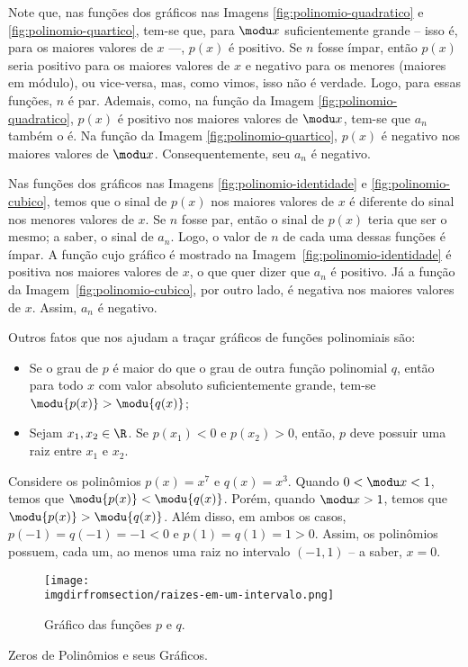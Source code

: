 \begin{solution}
  Note que, nas funções dos gráficos nas Imagens \ref{fig:polinomio-quadratico} e \ref{fig:polinomio-quartico},
  tem-se que, para $\modu x$ suficientemente grande -- isso é, para os maiores valores de $x$ ---, 
  $p(x)$ é positivo. 
  Se $n$ fosse ímpar, então $p(x)$ seria positivo para os maiores valores de $x$ e negativo para os menores (maiores
  em módulo), ou vice-versa, mas, como vimos, isso não é verdade. 
  Logo, para essas funções, $n$ é par. 
  Ademais, como, na função da Imagem \ref{fig:polinomio-quadratico}, $p(x)$ é positivo nos maiores valores de $\modu x$, 
  tem-se que $a_n$ também o é. Na função da Imagem \ref{fig:polinomio-quartico}, $p(x)$ é negativo nos maiores
  valores de $\modu x$. Consequentemente, seu $a_n$ é negativo.

  Nas funções dos gráficos nas Imagens \ref{fig:polinomio-identidade} e \ref{fig:polinomio-cubico}, temos que o 
  sinal de $p(x)$ nos maiores valores de $x$ é diferente do sinal nos menores valores de $x$.
  Se $n$ fosse par, então o sinal de $p(x)$ teria que ser o mesmo; a saber, o sinal de $a_n$.
  Logo, o valor de $n$ de cada uma dessas funções é ímpar.  
  A função cujo gráfico é mostrado na Imagem~\ref{fig:polinomio-identidade} é positiva nos maiores valores de $x$,
  o que quer dizer que $a_n$ é positivo. 
  Já a função da Imagem~\ref{fig:polinomio-cubico}, por outro lado, é negativa nos maiores valores de $x$.
  Assim, $a_n$ é negativo.
\end{solution}


Outros fatos que nos ajudam a traçar gráficos de funções polinomiais são:
%
\begin{itemize}
\item Se o grau de $p$ é maior do que o grau de outra função polinomial $q$, 
então para todo $x$ com valor absoluto suficientemente grande, 
tem-se $\modu {p(x)} > \modu{q(x)}$;
\item Sejam $x_1, x_2 \in \R$. Se $p(x_1) < 0$ e $p(x_2)>0$,
então, $p$ deve possuir uma raiz entre $x_1$ e $x_2$.
\end{itemize}

\begin{example}
Considere os polinômios $p(x) = x^7 $ e $q(x)=x^3$. 
Quando $0< \modu x < 1$, temos que $\modu {p(x)} < \modu{q(x)}$. 
Porém, quando $ \modu x > 1$, temos que $\modu {p(x)} > \modu{q(x)}$. 
Além disso, em ambos os casos, $p(-1) = q(-1) = -1 <0$ e $p(1) = q(1) = 1 >0$.
Assim, os polinômios possuem, cada um, ao menos uma raiz no
intervalo $(-1, 1)$ -- a saber, $x=0$.
\end{example}

\begin{figure}[H]
  \centering\texttt{[image: \\imgdirfromsection/raizes-em-um-intervalo.png]}
  \caption{Gráfico das funções $p$ e $q$.}
  \label{fig:raizes-em-um-intervalo}
\end{figure}

\begin{onlineact}
    {Zeros de Polinômios e seus Gráficos}.
\end{onlineact}